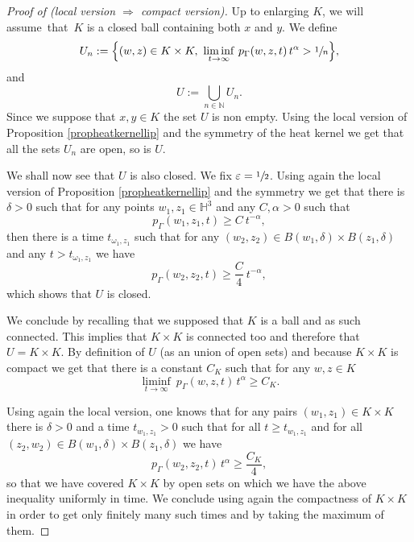 \documentclass[10pt]{amsart}
\let\epsilon\varepsilon
\theoremstyle{plain}
\theoremstyle{definition}
\newcommand{\HH}{\mathbb{H}}
\newcommand{\limiinf}[1]{\underset{#1}{\liminf}}
\begin{document}
\begin{proof}[Proof of (local version $\Rightarrow$ compact version)]
Up to enlarging $K$, we will assume~that~$K$ is a closed ball containing both $x$ and $y$. We define
\[
U_n := \Bigl\{ (w,z) \in K \times K, \ \limiinf{t \to \infty} \ p_{\Gamma}(w,z,t) \, t^{\alpha} > \sfrac{1}{n} \Bigr\},
\]
and
\[
U := \bigcup_{n \in \mathbb{N}} U_n.
\]
Since we suppose that $x,y \in K$ the set $U$ is non empty. Using the local version of Proposition \ref{propheatkernellip} and the symmetry of the heat kernel we get that all the sets $U_n$ are open, so is $U$.

We shall now see that $U$ is also closed. We fix $\epsilon = \sfrac{1}{2}$. Using again the local version of Proposition \ref{propheatkernellip} and the symmetry we get that there is $\delta > 0$ such that for any points $w_1,z_1 \in \HH^3$ and any $C, \alpha > 0$ such that
\[
p_{\Gamma}(w_1,z_1,t) \ge C \ t^{-\alpha},
\]
then there is a time $t_{\omega_1,z_1}$ such that for any $(w_2,z_2) \in B(w_1, \delta) \times B(z_1,\delta)$ and any $t > t_{\omega_1,z_1}$ we have
\[
p_{\Gamma}(w_2,z_2,t) \ge \frac{C}{4} \ t^{-\alpha},
\]
which shows that $U$ is closed.

We conclude by recalling that we supposed that $K$ is a ball and as such connected. This implies that $K \times K$ is connected too and therefore that $U =K \times K$. By definition of $U$ (as an union of open sets) and because $K \times K$ is compact we get that there is a constant $C_K$ such that for any $w,z \in K$
\[
\limiinf{t \to \infty} \ p_{\Gamma}(w,z,t)\,t^{\alpha} \ge C_K.
\]

Using again the local version, one knows that for any pairs $(w_1,z_1) \in K \times K$ there is $\delta > 0$ and a time $t_{w_1,z_1} > 0$ such that for all $t \ge t_{w_1,z_1}$ and for all $(z_2,w_2) \in B(w_1,\delta) \times B(z_1,\delta)$ we have
\[
p_{\Gamma}(w_2,z_2,t)\,t^{\alpha} \ge \frac{C_K}{4},
\]
so that we have covered $K \times K$ by open sets on which we have the above inequality uniformly in time. We conclude using again the compactness of $K \times K$ in order to get only finitely many such times and by taking the maximum of them.
\end{proof}
\end{document}
